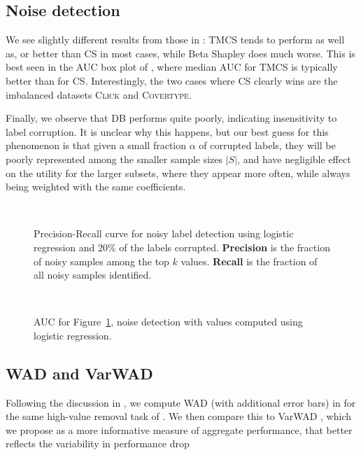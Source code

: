 \documentclass[10pt]{article}
\newcommand{\tmdfn}[1]{\textbf{#1}}
\newcommand{\tmname}[1]{\textsc{#1}}
\begin{document}
\subsection{Noise detection}\label{sec:noise-detection}

We see slightly different results from those in
{\cite{schoch_csshapley_2022}}: TMCS tends to perform as well as, or better
than CS in most cases, while Beta Shapley does much worse. This is best seen
in the AUC box plot of , where median AUC for TMCS is
typically better than for CS. Interestingly, the two cases where CS clearly
wins are the imbalanced datasets {\tmname{Click}} and {\tmname{Covertype}}.

Finally, we observe that DB performs quite poorly, indicating insensitivity to
label corruption. It is unclear why this happens, but our best guess for this
phenomenon is that given a small fraction $\alpha$ of corrupted labels, they
will be poorly represented among the smaller sample sizes $| S |$, and have
negligible effect on the utility for the larger subsets, where they appear
more often, while always being weighted with the same coefficients.

\begin{figure}[h]
  \
  \caption{\label{fig:precision-recall-lr}Precision-Recall curve for noisy
  label detection using logistic regression and 20\% of the labels corrupted.
  {\tmdfn{Precision}} is the fraction of noisy samples among the top $k$
  values. {\tmdfn{Recall}} is the fraction of all noisy samples identified.}
\end{figure}

\begin{figure}[h]
  \
  \caption{\label{fig:auc-lr}AUC for  Figure~\ref{fig:precision-recall-lr},
  noise detection with values computed using logistic regression.}
\end{figure}

\subsection{WAD and VarWAD}\label{sec:wad}

Following the discussion in , we compute WAD
(with additional error bars) in  for the same high-value
removal task of \Cref{sec:high-value}. We then compare this to VarWAD
\Cref{eq:varwad}, which we propose as a more informative measure of aggregate
performance, that better reflects the variability in performance drop
\end{document}
